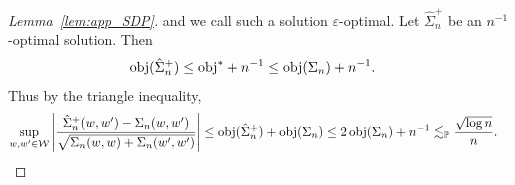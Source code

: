 \begin{proof}[Lemma~\ref{lem:app_SDP}]
  and we call such a solution $\varepsilon$-optimal.
  Let $\hat \Sigma_n^+$ be an $n^{-1}$-optimal solution.
  Then
  \begin{align*}
    \mathrm{obj}(\hat \Sigma_n^+)
    &\leq \mathrm{obj}^* + n^{-1}
    \leq \mathrm{obj}(\Sigma_n) + n^{-1}.
  \end{align*}
  Thus by the triangle inequality,
  \begin{align*}
    \sup_{w,w' \in \mathcal{W}}
    \left|
    \frac{\hat \Sigma_n^+(w,w') - \Sigma_n(w,w')}
    {\sqrt{\Sigma_n(w,w) + \Sigma_n(w',w')}}
    \right|
    &\leq
    \mathrm{obj}(\hat \Sigma_n^+)
    + \mathrm{obj}(\Sigma_n)
    \leq 2 \, \mathrm{obj}(\Sigma_n) + n^{-1}
    \lesssim_{\mathbb{P}}
    \frac{\sqrt{\log n}}{n}.
  \end{align*}
\end{proof}

